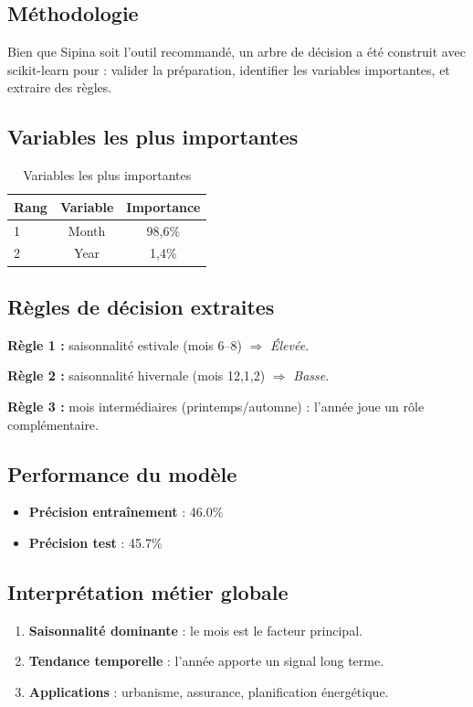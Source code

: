 \documentclass[10pt,a4paper]{article}
\begin{document}
\subsection{Méthodologie}
Bien que Sipina soit l'outil recommandé, un arbre de décision a été construit avec scikit-learn pour : valider la préparation, identifier les variables importantes, et extraire des règles.

\subsection{Variables les plus importantes}
\begin{table}[H]
\centering
\footnotesize
\begin{tabular}{lcc}
\toprule
\textbf{Rang} & \textbf{Variable} & \textbf{Importance} \\
\midrule
1 & Month & 98,6\% \\
2 & Year & 1,4\% \\
\bottomrule
\end{tabular}
\caption{Variables les plus importantes}
\end{table}

\subsection{Règles de décision extraites}
\textbf{Règle 1 :} saisonnalité estivale (mois 6--8) $\Rightarrow$ \textit{Élevée}.

\textbf{Règle 2 :} saisonnalité hivernale (mois 12,1,2) $\Rightarrow$ \textit{Basse}.

\textbf{Règle 3 :} mois intermédiaires (printemps/automne) : l'année joue un rôle complémentaire.

\subsection{Performance du modèle}
\begin{itemize}
\item \textbf{Précision entraînement} : 46.0\%
\item \textbf{Précision test} : 45.7\%
\end{itemize}

\subsection{Interprétation métier globale}
\begin{enumerate}
\item \textbf{Saisonnalité dominante} : le mois est le facteur principal.
\item \textbf{Tendance temporelle} : l'année apporte un signal long terme.
\item \textbf{Applications} : urbanisme, assurance, planification énergétique.
\end{enumerate}
\end{document}
